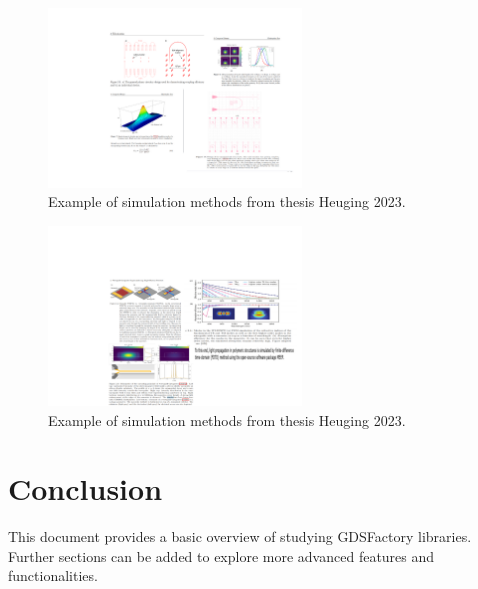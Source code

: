 \documentclass[a4paper,12pt]{article}
\begin{document}
\begin{figure}[h]
  \centering
  \includegraphics[width=0.6\textwidth]{figs/sim_2.pdf} %
  \caption{Example of simulation methods from thesis Heuging  2023.}
  \label{sim_1}
\end{figure}


\begin{figure}[h]
  \centering
  \includegraphics[width=0.6\textwidth]{figs/sim_3.pdf} %
  \caption{Example of simulation methods from thesis Heuging  2023.}
  \label{sim_1}
\end{figure}









\section{Conclusion}

This document provides a basic overview of studying GDSFactory libraries. Further sections can be added to explore more advanced features and functionalities.
\end{document}
